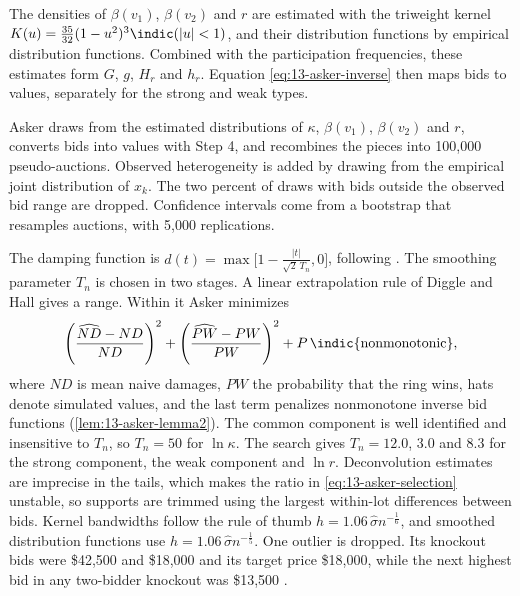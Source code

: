 The densities of $\beta(v_1)$, $\beta(v_2)$ and $r$ are estimated with the triweight kernel
$K(u)=\frac{35}{32}(1-u^2)^3\indic(|u|<1)$, and their distribution functions by empirical distribution functions.
Combined with the participation frequencies, these estimates form $G$, $g$, $H_r$ and $h_r$. Equation \eqref{eq:13-asker-inverse} then maps bids to
values, separately for the strong and weak types.

Asker draws from the estimated distributions of $\kappa$, $\beta(v_1)$, $\beta(v_2)$ and $r$, converts bids into
values with Step 4, and recombines the pieces into 100,000 pseudo-auctions. Observed heterogeneity is added by
drawing from the empirical joint distribution of $x_k$. The two percent of draws with bids outside the observed bid
range are dropped. Confidence intervals come from a bootstrap that resamples auctions, with 5,000 replications.

The damping function is $d(t)=\max\bigl[1-\frac{|t|}{\sqrt2\,T_n},0\bigr]$, following \citet{DiggleHall1993}. The
smoothing parameter $T_n$ is chosen in two stages. A linear extrapolation rule of Diggle and Hall gives a range.
Within it Asker minimizes
\[
\left(\frac{\widehat{ND}-ND}{ND}\right)^2+\left(\frac{\widehat{PW}-PW}{PW}\right)^2+P\,\indic\{\text{nonmonotonic}\},
\]
where $ND$ is mean naive damages, $PW$ the probability that the ring wins, hats denote simulated values, and the
last term penalizes nonmonotone inverse bid functions (\cref{lem:13-asker-lemma2}). The common component is well
identified and insensitive to $T_n$, so $T_n=50$ for $\ln\kappa$. The search gives $T_n=12.0$, $3.0$ and $8.3$ for
the strong component, the weak component and $\ln r$. Deconvolution estimates are imprecise in the tails, which
makes the ratio in \eqref{eq:13-asker-selection} unstable, so supports are trimmed using the largest within-lot
differences between bids. Kernel bandwidths follow the rule of thumb $h=1.06\,\hat\sigma n^{-\frac{1}{6}}$, and
smoothed distribution functions use $h=1.06\,\hat\sigma n^{-\frac{1}{5}}$. One outlier is dropped. Its knockout
bids were \$42,500 and \$18,000 and its target price \$18,000, while the next highest bid in any two-bidder
knockout was \$13,500 \citep[pp.~748--749]{Asker2010}.

